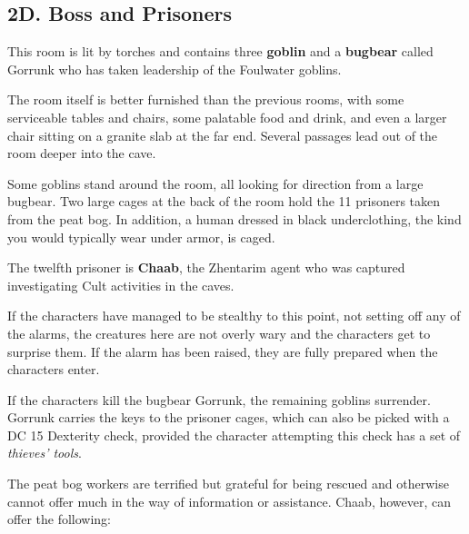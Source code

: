 \documentclass[10pt,a4paper,twoside,bg=print,twocolumn,openany,nodeprecatedcode]{dndbook}
\begin{document}
\subsection{2D. Boss and Prisoners}
This room is lit by torches and contains three \textbf{goblin} and a \textbf{bugbear} called Gorrunk who has taken leadership of the Foulwater goblins.

\begin{DndReadAloud}{}
The room itself is better furnished than the previous rooms, with some serviceable tables and chairs, some palatable food and drink, and even a larger chair sitting on a granite slab at the far end. Several passages lead out of the room deeper into the cave.

Some goblins stand around the room, all looking for direction from a large bugbear. Two large cages at the back of the room hold the 11 prisoners taken from the peat bog. In addition, a human dressed in black underclothing, the kind you would typically wear under armor, is caged.

\end{DndReadAloud}

The twelfth prisoner is \textbf{Chaab}, the Zhentarim agent who was captured investigating Cult activities in the caves.

If the characters have managed to be stealthy to this point, not setting off any of the alarms, the creatures here are not overly wary and the characters get to surprise them. If the alarm has been raised, they are fully prepared when the characters enter.

If the characters kill the bugbear Gorrunk, the remaining goblins surrender. Gorrunk carries the keys to the prisoner cages, which can also be picked with a DC 15 Dexterity check, provided the character attempting this check has a set of \textit{thieves' tools}.

The peat bog workers are terrified but grateful for being rescued and otherwise cannot offer much in the way of information or assistance. Chaab, however, can offer the following:
\end{document}
